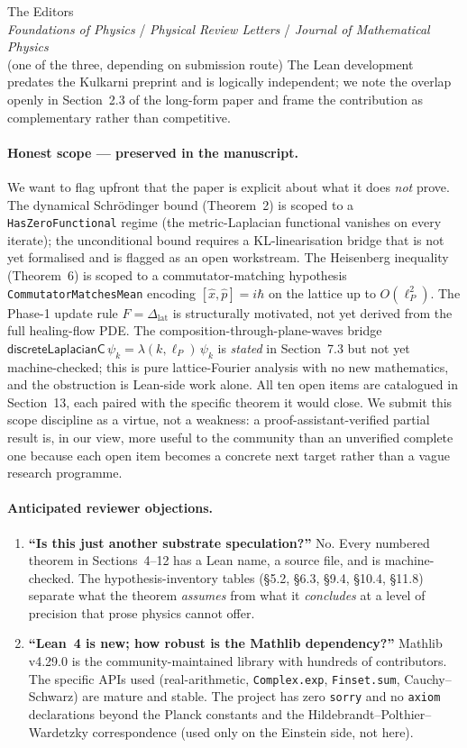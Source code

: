 \documentclass[11pt,a4paper]{letter}
\begin{document}
\begin{letter}{%
  The Editors\\
  \emph{Foundations of Physics} / \emph{Physical Review Letters} / \emph{Journal of Mathematical Physics}\\
  (one of the three, depending on submission route)}
The Lean development predates the Kulkarni preprint and is logically
independent; we note the overlap openly in Section~2.3 of the
long-form paper and frame the contribution as complementary rather
than competitive.

\paragraph{Honest scope --- preserved in the manuscript.}
We want to flag upfront that the paper is explicit about what it
does \emph{not} prove. The dynamical Schr\"odinger bound
(Theorem~2) is scoped to a \texttt{HasZeroFunctional} regime (the
metric-Laplacian functional vanishes on every iterate); the
unconditional bound requires a KL-linearisation bridge that is not
yet formalised and is flagged as an open workstream. The Heisenberg
inequality (Theorem~6) is scoped to a commutator-matching
hypothesis \texttt{CommutatorMatchesMean} encoding $[\hat
x,\hat{p}]=i\hbar$ on the lattice up to $O(\ell_{P}^{2})$. The
Phase-1 update rule $F=\Delta_{\mathrm{lat}}$ is structurally
motivated, not yet derived from the full healing-flow PDE. The
composition-through-plane-waves bridge
$\mathsf{discreteLaplacianC}\,\psi_{k}=\lambda(k,\ell_{P})\,\psi_{k}$
is \emph{stated} in Section~7.3 but not yet machine-checked; this is
pure lattice-Fourier analysis with no new mathematics, and the
obstruction is Lean-side work alone. All ten open items are
catalogued in Section~13, each paired with the specific theorem it
would close. We submit this scope discipline as a virtue, not a
weakness: a proof-assistant-verified partial result is, in our view,
more useful to the community than an unverified complete one
because each open item becomes a concrete next target rather than a
vague research programme.

\paragraph{Anticipated reviewer objections.}
\begin{enumerate}
\item \textbf{``Is this just another substrate speculation?''} No.
  Every numbered theorem in Sections~4--12 has a Lean name, a source
  file, and is machine-checked. The hypothesis-inventory tables
  (§5.2, §6.3, §9.4, §10.4, §11.8) separate what the
  theorem \emph{assumes} from what it \emph{concludes} at a level of
  precision that prose physics cannot offer.

\item \textbf{``Lean~4 is new; how robust is the Mathlib dependency?''}
  Mathlib v4.29.0 is the community-maintained library with hundreds
  of contributors. The specific APIs used (real-arithmetic,
  \texttt{Complex.exp}, \texttt{Finset.sum}, Cauchy--Schwarz) are
  mature and stable. The project has zero \texttt{sorry} and no
  \texttt{axiom} declarations beyond the Planck constants and the
  Hildebrandt--Polthier--Wardetzky correspondence (used only on the
  Einstein side, not here).


\end{enumerate}
\end{letter}
\end{document}
